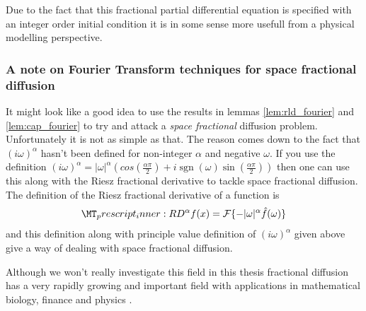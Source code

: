 Due to the fact that this fractional partial differential equation is specified with an integer order initial condition it is in some sense more usefull from a physical modelling perspective. 

\subsubsection{A note on Fourier Transform techniques for space fractional diffusion}
It might look like a good idea to use the results in lemmas \ref{lem:rld_fourier} and \ref{lem:cap_fourier} to try and attack a \emph{space fractional} diffusion problem. Unfortunately it is not as simple as that. The reason comes down to the fact that $ (i\omega)^\alpha $ hasn't been defined for non-integer $ \alpha $ and negative $ \omega $. If you use the definition $  (i\omega)^\alpha = |\omega|^\alpha\left(cos\left(\frac{\alpha\pi}{2}\right) + i\operatorname{sgn}(\omega)\sin\left(\frac{\alpha\pi}{2}\right)\right) $ then one can use this along with the Riesz fractional derivative to tackle space fractional diffusion. The definition of the Riesz fractional derivative of a function is
\begin{align}
	\prescript{R}{}{D}^\alpha f(x) = \mathcal{F} \{ -|\omega|^\alpha \hat{f}(\omega) \}
\end{align}
and this definition along with principle value definition of $ (i\omega)^\alpha $ given above give a way of dealing with space fractional diffusion.

Although we won't really investigate this field in this thesis fractional diffusion has a very rapidly growing and important field with applications in mathematical biology, finance and physics \cite{Henry2010}.
\clearpage

